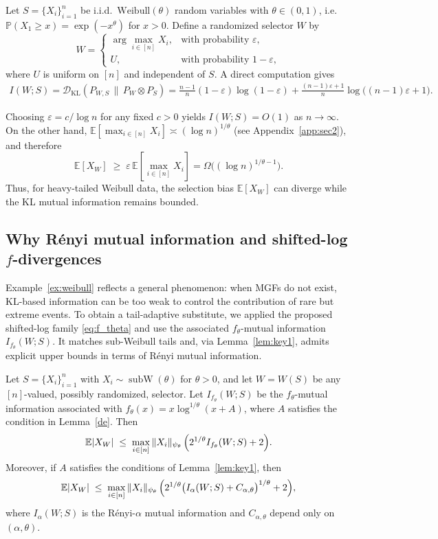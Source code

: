 \documentclass[11pt]{article}
\providecommand{\DD}{\mathcal{D}}
\providecommand{\Renyi}{R\'enyi }
\providecommand{\subw}{\operatorname{subW}}
\begin{document}
\begin{example}\label{ex:weibull}
Let $S=\{X_i\}_{i=1}^n$ be i.i.d.\ $\mathrm{Weibull}(\theta)$ random variables
with $\theta\in(0,1)$, i.e.\ $\mathbb{P}(X_1\ge x)=\exp(-x^\theta)$ for $x>0$.
Define a randomized selector $W$ by
\[
W=
\begin{cases}
\arg\max_{i\in[n]}X_i, & \text{with probability }\varepsilon,\\
U, & \text{with probability }1-\varepsilon,
\end{cases}
\]
where $U$ is uniform on $[n]$ and independent of $S$.
A direct computation gives
\[
\begin{aligned}
I(W;S)
= \DD_{\mathrm{KL}}(P_{W,S}\,\|\,P_W\otimes P_S) = \frac{n-1}{n}(1-\varepsilon)\log(1-\varepsilon)
   + \frac{(n-1)\varepsilon+1}{n}\log\bigl((n-1)\varepsilon+1\bigr).
\end{aligned}
\]

Choosing $\varepsilon=c/\log n$ for any fixed $c>0$ yields $I(W;S)=O(1)$ as
$n\to\infty$.  On the other hand,
$\mathbb{E}[\max_{i\in[n]}X_i]\asymp (\log n)^{1/\theta}$ (see Appendix~\ref{app:sec2}), and therefore
\[
\mathbb{E}[X_W]
\;\ge\;
\varepsilon\,\mathbb{E}[\max_{i\in[n]}X_i]
=\Omega \bigl((\log n)^{1/\theta-1}\bigr).
\]
Thus, for heavy-tailed Weibull data, the selection bias $\mathbb{E}[X_W]$ can
diverge while the KL mutual information remains bounded.
\end{example}

\subsection{Why \Renyi mutual information and shifted-log \texorpdfstring{$f$}{f}-divergences}

Example~\ref{ex:weibull} reflects a general phenomenon: when MGFs do not exist,
KL-based information can be too weak to control the contribution of rare but
extreme events.  To obtain a tail-adaptive substitute, we applied the proposed shifted-log
family \eqref{eq:f_theta} and use the associated $f_\theta$-mutual information $I_{f_\theta}(W;S)$.
It matches sub-Weibull tails and, via Lemma~\ref{lem:key1}, admits explicit upper bounds in terms of R\'enyi mutual
information.

\begin{theorem}\label{infob}
Let $S=\{X_i\}_{i=1}^n$ with $X_i \sim \subw(\theta)$ for $\theta>0$, and let $W=W(S)$ be any $[n]$-valued, possibly randomized, selector. Let $I_{f_\theta}(W;S)$ be the $f_\theta$-mutual information associated with $f_\theta(x)=x\log^{1/\theta}(x+A)$, where $A$ satisfies the condition in Lemma~\ref{de}. Then
\[
\mathbb{E}|X_W|
\;\le\;
\max_{i\in[n]}\|X_i\|_{\psi_\theta}\,\Bigl(2^{1/\theta}I_{f_\theta}(W;S)+2\Bigr).
\]
Moreover, if $A$ satisfies the conditions of Lemma~\ref{lem:key1}, then
\[
\mathbb{E}|X_W|
\;\le\;
\max_{i\in[n]}\|X_i\|_{\psi_\theta}\,
\Bigl(2^{1/\theta}\bigl(I_\alpha(W;S)+C_{\alpha,\theta}\bigr)^{1/\theta}+2\Bigr),
\]
where $I_\alpha(W;S)$ is the R\'enyi-$\alpha$ mutual information and
$C_{\alpha,\theta}$ depend only on $(\alpha,\theta)$.
\end{theorem}
\end{document}
